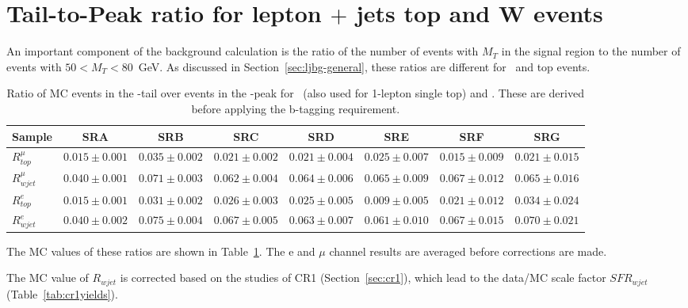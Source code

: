 \section{Tail-to-Peak ratio for lepton $+$ jets top and W events}
\label{sec:ttp}

An important component
of the background calculation is the ratio of the number of events with $M_T$ in the signal region
to the number of events with $50 < M_T < 80$~GeV.  
As discussed in Section~\ref{sec:ljbg-general}, these ratios are different for \wjets\ and 
top events.  



\begin{table}[!h]
\begin{center}
{\footnotesize
\begin{tabular}{l||c|c|c|c|c|c|c}
\hline
Sample              & SRA & SRB & SRC & SRD & SRE & SRF & SRG\\
\hline
\hline
$R^{\mu}_{top}$ 	  & $0.015 \pm 0.001$  & $0.035 \pm 0.002$  & $0.021 \pm 0.002$  & $0.021 \pm 0.004$  & $0.025 \pm 0.007$  & $0.015 \pm 0.009$  & $0.021 \pm 0.015$  \\
$R^{\mu}_{wjet}$ 	  & $0.040 \pm 0.001$  & $0.071 \pm 0.003$  & $0.062 \pm 0.004$  & $0.064 \pm 0.006$  & $0.065 \pm 0.009$  & $0.067 \pm 0.012$  & $0.065 \pm 0.016$  \\
\hline
\hline
$R^e_{top}$ 	  & $0.015 \pm 0.001$  & $0.031 \pm 0.002$  & $0.026 \pm 0.003$  & $0.025 \pm 0.005$  & $0.009 \pm 0.005$  & $0.021 \pm 0.012$  & $0.034 \pm 0.024$  \\
$R^e_{wjet}$ 	  & $0.040 \pm 0.002$  & $0.075 \pm 0.004$  & $0.067 \pm 0.005$  & $0.063 \pm 0.007$  & $0.061 \pm 0.010$  & $0.067 \pm 0.015$  & $0.070 \pm 0.021$  \\
\hline
\end{tabular}}
\caption{ Ratio of MC events in the \mt-tail over events in the \mt-peak for
  \ttsl\ (also used for 1-lepton single top) and \wjets. These are
  derived before applying the b-tagging requirement.  
\label{tab:ttp}}
\end{center}
\end{table}

The MC values of these ratios are shown in Table~\ref{tab:ttp}. The e and $\mu$ channel results are averaged before corrections are made.

The MC value of $R_{wjet}$ is corrected based on the studies of CR1 (Section~\ref{sec:cr1}), which
lead to the data/MC scale factor $SFR_{wjet}$ (Table~\ref{tab:cr1yields}).

